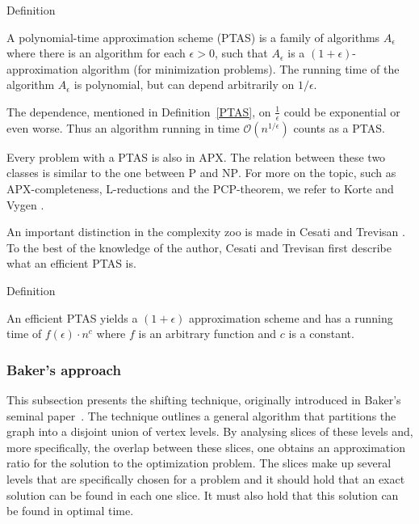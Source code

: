 \begin{mydefinition}{Definition}
    \label{PTAS}
    
    A polynomial-time approximation scheme (PTAS) is a family of algorithms ${A_{\epsilon}}$ where there is an algorithm for each $\epsilon > 0$, 
    such that $A_{\epsilon}$ is a $(1 + \epsilon)$-approximation algorithm (for minimization problems). The running time of the algorithm $A_{\epsilon}$ 
    is polynomial, but can depend arbitrarily on $1/\epsilon$. 

\end{mydefinition}

The dependence, mentioned in Definition~\ref{PTAS}, on $\frac{1}{\epsilon}$ could be exponential
or even worse.
Thus an algorithm running in time $\mathcal{O}(n^{1/\epsilon})$ counts as a PTAS.

Every problem with a PTAS is also in APX. The relation between these two classes is similar to the one between 
\textsc{P} and \textsc{NP}. For more on the topic, such as APX-completeness,
L-reductions and the PCP-theorem, we refer to Korte and Vygen \cite{Korte2007CombinatorialOT}.

An important distinction in the complexity zoo is made in Cesati and
Trevisan \cite{cesati1997efficiency}. To the best of the knowledge of the author, 
Cesati and Trevisan first describe what an efficient PTAS is.

\begin{mydefinition}{Definition}
    \label{def:EPTAS}
    
    An efficient PTAS yields a $(1 + \epsilon)$ approximation scheme and has a running time 
    of $f(\epsilon) \cdot n^{c}$ where $f$ is an arbitrary function and $c$ is a constant. 

\end{mydefinition}

\subsubsection{Baker's approach}
\label{subsection:baker}

This subsection presents the shifting technique, originally introduced in Baker's seminal 
paper~\cite{Baker}. The technique outlines a general algorithm that partitions the graph 
into a disjoint union of vertex levels. By analysing slices of these 
levels and, more specifically, the overlap between these slices, one obtains an approximation ratio for the solution to the optimization 
problem. The slices make up several levels that are specifically chosen for a problem and it should hold that an exact solution 
can be found in each one slice. It must also hold that this solution can be found in optimal time. 

